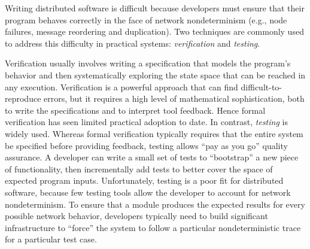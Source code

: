 
Writing distributed software is difficult because developers must ensure that
their program behaves correctly in the face of network nondeterminism (e.g.,
node failures, message reordering and duplication). Two techniques are commonly
used to address this difficulty in practical systems: \emph{verification} and
\emph{testing}.

Verification usually involves writing a specification that models the program's
behavior and then systematically exploring the state space that can be reached
in any execution. Verification is a powerful approach that can find
difficult-to-reproduce errors, but it requires a high level of mathematical
sophistication, both to write the specifications and to interpret tool feedback.
Hence formal verification has seen limited practical adoption to date. In
contrast, \emph{testing} is widely used. Whereas formal verification typically
requires that the entire system be specified before providing feedback, testing
allows ``pay as you go'' quality assurance. A developer can write a small set of
tests to ``bootstrap'' a new piece of functionality, then incrementally add
tests to better cover the space of expected program inputs. Unfortunately,
testing is a poor fit for distributed software, because few testing tools allow
the developer to account for network nondeterminism. To ensure that a module
produces the expected results for every possible network behavior, developers
typically need to build significant infrastructure to ``force'' the system to
follow a particular nondeterministic trace for a particular test case.



